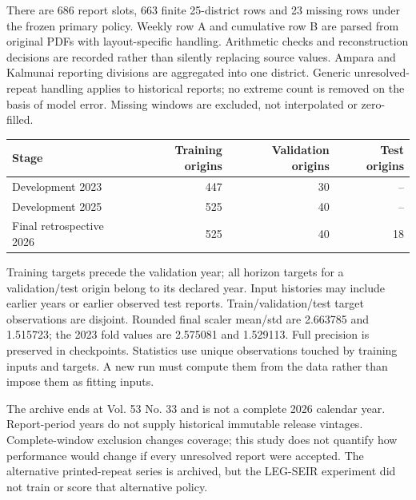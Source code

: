 \documentclass[11pt]{article}
\begin{document}
There are 686 report slots, 663 finite 25-district rows and 23 missing rows under the frozen primary policy. Weekly row A and cumulative row B are parsed from original PDFs with layout-specific handling. Arithmetic checks and reconstruction decisions are recorded rather than silently replacing source values. Ampara and Kalmunai reporting divisions are aggregated into one district. Generic unresolved-repeat handling applies to historical reports; no extreme count is removed on the basis of model error. Missing windows are excluded, not interpolated or zero-filled.

\begin{center}
\begin{tabular}{lrrr}\toprule Stage & Training origins & Validation origins & Test origins\\\midrule
Development 2023 &447&30&--\\
Development 2025 &525&40&--\\
Final retrospective 2026 &525&40&18\\\bottomrule\end{tabular}
\end{center}
Training targets precede the validation year; all horizon targets for a validation/test origin belong to its declared year. Input histories may include earlier years or earlier observed test reports. Train/validation/test target observations are disjoint. Rounded final scaler mean/std are 2.663785 and 1.515723; the 2023 fold values are 2.575081 and 1.529113. Full precision is preserved in checkpoints. Statistics use unique observations touched by training inputs and targets. A new run must compute them from the data rather than impose them as fitting inputs.

The archive ends at Vol. 53 No. 33 and is not a complete 2026 calendar year. Report-period years do not supply historical immutable release vintages. Complete-window exclusion changes coverage; this study does not quantify how performance would change if every unresolved report were accepted. The alternative printed-repeat series is archived, but the LEG-SEIR experiment did not train or score that alternative policy.
\end{document}
